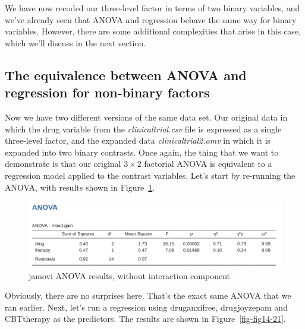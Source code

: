 \documentclass[
  a4paper,
]{book}
\begin{document}
We have now recoded our three-level factor in terms of two binary
variables, and we've already seen that ANOVA and regression behave the
same way for binary variables. However, there are some additional
complexities that arise in this case, which we'll discuss in the next
section.

\hypertarget{the-equivalence-between-anova-and-regression-for-non-binary-factors}{%
\subsection{The equivalence between ANOVA and regression for non-binary
factors}\label{the-equivalence-between-anova-and-regression-for-non-binary-factors}}

Now we have two different versions of the same data set. Our original
data in which the drug variable from the \emph{clinicaltrial.csv} file
is expressed as a single three-level factor, and the expanded data
\emph{clinicaltrial2.omv} in which it is expanded into two binary
contrasts. Once again, the thing that we want to demonstrate is that our
original \(3 \times 2\) factorial ANOVA is equivalent to a regression
model applied to the contrast variables. Let's start by re-running the
ANOVA, with results shown in Figure~\ref{fig-fig14-20}.

\begin{figure}

\includegraphics[width=1\textwidth,height=\textheight]{images/fig14-20.png} \hfill{}

\caption{\label{fig-fig14-20}jamovi ANOVA results, without interaction
component}

\end{figure}

Obviously, there are no surprises here. That's the exact same ANOVA that
we ran earlier. Next, let's run a regression using druganxifree,
drugjoyzepam and CBTtherapy as the predictors. The results are shown in
Figure~\ref{fig-fig14-21}.
\end{document}
